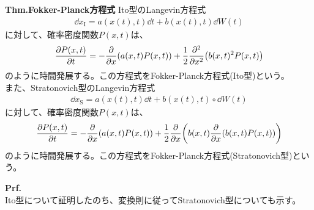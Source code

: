 \documentclass[a4paper,11pt]{jsarticle}
\numberwithin{equation}{section}
\begin{document}
\begin{itembox}[l]{\textbf{Thm.Fokker-Planck方程式}}
  Ito型のLangevin方程式
  \begin{align}
    \dd{x}_{\text{I}} = a(x(t),t)\dd{t} + b(x(t),t)\dd{W(t)}
  \end{align}
  に対して、確率密度関数$P(x,t)$は、
  \begin{align}
    \pdv{P(x,t)}{t} = -\pdv{}{x}\qty(a(x,t)P(x,t)) + \frac{1}{2}\pdv[2]{}{x}\qty(b(x,t)^2P(x,t))
  \end{align}
  のように時間発展する。この方程式をFokker-Planck方程式(Ito型)という。\\
  また、Stratonovich型のLangevin方程式
  \begin{align}
    \dd{x}_{\text{S}} = a(x(t),t)\dd{t} + b(x(t),t)\circ \dd{W(t)}
  \end{align}
  に対して、確率密度関数$P(x,t)$は、
  \begin{align}
    \pdv{P(x,t)}{t} = -\pdv{}{x}\qty(a(x,t)P(x,t)) + \frac{1}{2}\pdv{}{x}\qty(b(x,t)\pdv{}{x}\qty(b(x,t)P(x,t)))
  \end{align}
  のように時間発展する。この方程式をFokker-Planck方程式(Stratonovich型)という。
\end{itembox}
\textbf{Prf.}\\
Ito型について証明したのち、変換則に従ってStratonovich型についても示す。\\
\end{document}
